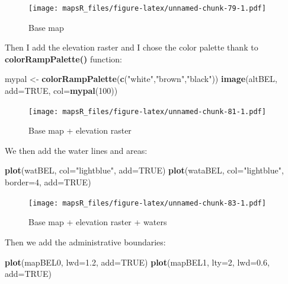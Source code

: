 \documentclass[]{report}
\newenvironment{Shaded}{\begin{snugshade}}{\end{snugshade}}
\newcommand{\KeywordTok}[1]{\textcolor[rgb]{0.13,0.29,0.53}{\textbf{{#1}}}}
\newcommand{\DataTypeTok}[1]{\textcolor[rgb]{0.13,0.29,0.53}{{#1}}}
\newcommand{\DecValTok}[1]{\textcolor[rgb]{0.00,0.00,0.81}{{#1}}}
\newcommand{\FloatTok}[1]{\textcolor[rgb]{0.00,0.00,0.81}{{#1}}}
\newcommand{\StringTok}[1]{\textcolor[rgb]{0.31,0.60,0.02}{{#1}}}
\newcommand{\OtherTok}[1]{\textcolor[rgb]{0.56,0.35,0.01}{{#1}}}
\newcommand{\NormalTok}[1]{{#1}}
\begin{document}
\begin{figure}[htbp]
\centering
\texttt{[image: mapsR\_files/figure-latex/unnamed-chunk-79-1.pdf]}
\caption{Base map}
\end{figure}

Then I add the elevation raster and I chose the color palette thank to
\textbf{colorRampPalette()} function:

\begin{Shaded}
\begin{Highlighting}[]
\NormalTok{mypal <-}\StringTok{ }\KeywordTok{colorRampPalette}\NormalTok{(}\KeywordTok{c}\NormalTok{(}\StringTok{"white"}\NormalTok{,}\StringTok{"brown"}\NormalTok{,}\StringTok{"black"}\NormalTok{))}
\KeywordTok{image}\NormalTok{(altBEL, }\DataTypeTok{add=}\OtherTok{TRUE}\NormalTok{, }\DataTypeTok{col=}\KeywordTok{mypal}\NormalTok{(}\DecValTok{100}\NormalTok{))}
\end{Highlighting}
\end{Shaded}

\begin{figure}[htbp]
\centering
\texttt{[image: mapsR\_files/figure-latex/unnamed-chunk-81-1.pdf]}
\caption{Base map + elevation raster}
\end{figure}

We then add the water lines and areas:

\begin{Shaded}
\begin{Highlighting}[]
\KeywordTok{plot}\NormalTok{(watBEL, }\DataTypeTok{col=}\StringTok{"lightblue"}\NormalTok{, }\DataTypeTok{add=}\OtherTok{TRUE}\NormalTok{)}
\KeywordTok{plot}\NormalTok{(wataBEL, }\DataTypeTok{col=}\StringTok{"lightblue"}\NormalTok{, }\DataTypeTok{border=}\DecValTok{4}\NormalTok{, }\DataTypeTok{add=}\OtherTok{TRUE}\NormalTok{)}
\end{Highlighting}
\end{Shaded}

\begin{figure}[htbp]
\centering
\texttt{[image: mapsR\_files/figure-latex/unnamed-chunk-83-1.pdf]}
\caption{Base map + elevation raster + waters}
\end{figure}

Then we add the administrative boundaries:

\begin{Shaded}
\begin{Highlighting}[]
\KeywordTok{plot}\NormalTok{(mapBEL0, }\DataTypeTok{lwd=}\FloatTok{1.2}\NormalTok{, }\DataTypeTok{add=}\OtherTok{TRUE}\NormalTok{)}
\KeywordTok{plot}\NormalTok{(mapBEL1, }\DataTypeTok{lty=}\DecValTok{2}\NormalTok{, }\DataTypeTok{lwd=}\FloatTok{0.6}\NormalTok{, }\DataTypeTok{add=}\OtherTok{TRUE}\NormalTok{)}
\end{Highlighting}
\end{Shaded}
\end{document}
